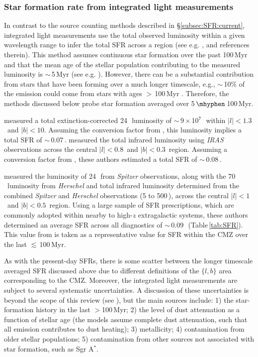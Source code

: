 \subsubsection{Star formation rate from integrated light measurements}
\label{subsec:SFR:past}

In contrast to the source counting methods described in \S\ref{subsec:SFR:current}, integrated light measurements use the total observed luminosity within a given wavelength range to infer the total SFR across a region (see e.g. \citealp{Kennicutt2012}, and references therein).
This method assumes continuous star formation over the past 100\,Myr and that the mean age of the stellar population contributing to the measured luminosity is $\sim$\,5\,Myr (see e.g. \citealp{Kennicutt1998}). 
However, there can be a substantial contribution from stars that have been forming over a much longer timescale, e.g., $\sim$\,10\% of the emission could come from stars with ages $>$\,100\,Myr \citep{Kennicutt2012}.
Therefore, the methods discussed below probe star formation averaged over 5\,$\mhyphen$\,100\,Myr. 

\citet{Yusef-Zadeh2009} measured a total extinction-corrected 24\,\micron\ luminosity of $\sim$\,9\,$\times$\,10$^{7}$\,\lsun\ within $|l|<1.3$\degree\ and $|b|<10$\arcmin. Assuming the conversion factor from \citet{Rieke2009}, this luminosity implies a total SFR of $\sim$\,0.07\,\msunyr. \citet{Crocker2011a} measured the total infrared luminosity using {\em IRAS} observations across the central $|l|<0.8$\degree\ and $|b|<0.3$\degree\ region. Assuming a conversion factor from \citet{Kennicutt1998}, these authors estimated a total SFR of $\sim$\,0.08\,\msunyr. 

\citet{Barnes2017} measured the luminosity of 24\,\micron\ from {\it Spitzer} observations, along with the 70\,\micron\ luminosity from {\it Herschel} and total infrared luminosity determined from the combined {\it Spitzer} and {\it Herschel} observations (5 to 500\,\micron), across the central $|l|<1$\degree\ and $|b|<0.5$\degree\ region. 
Using a large sample of SFR prescriptions, which are commonly adopted within nearby to high-$z$ extragalactic systems, these authors determined an average SFR across all diagnostics of $\sim$\,0.09\,\msunyr \ (Table\,\ref{tab:SFR}). 
This value from \citet{Barnes2017} is taken as a representative value for SFR within the CMZ over the last $\lesssim$\,100\,Myr. 

As with the present-day SFRs, there is some scatter between the longer timescale averaged SFR discussed above due to different definitions of the $\{l,b\}$ area corresponding to the CMZ. Moreover, the integrated light measurements are subject to several systematic uncertainties. A discussion of these uncertainties is beyond the scope of this review (see \citealp{Kennicutt2012}), but the main sources include: 1) the star-formation history in the last $>$100\,Myr; 2) the level of dust attenuation as a function of stellar age (the models assume complete dust attenuation, such that all emission contributes to dust heating); 3) metallicity; 4) contamination from older stellar populations; 5) contamination from other sources not associated with star formation, such as Sgr A$^*$. 

